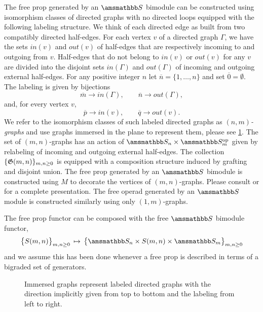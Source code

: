 The free prop generated by an $\S$ bimodule can be constructed using isomorphism classes of directed graphs with no directed loops equipped with the following labeling structure.
We think of each directed edge as built from two compatibly directed half-edges. For each vertex $v$ of a directed graph $\Gamma$, we have the sets $in(v)$ and $out(v)$ of half-edges that are respectively incoming to and outgoing from $v$. Half-edges that do not belong to $in(v)$ or $out(v)$ for any $v$ are divided into the disjoint sets $in(\Gamma)$ and $out(\Gamma)$ of incoming and outgoing external half-edges.
For any positive integer $n$ let $\overline{n} = \{1,\dots,n\}$ and set $\overline{0} = \emptyset$.
The labeling is given by bijections  
\begin{equation*}
\overline{m} \to in(\Gamma), \qquad
\overline{n} \to out(\Gamma),
\end{equation*}
and, for every vertex $v$,
\begin{equation*}
\overline{p} \to in(v), \qquad
\overline{q} \to out(v).
\end{equation*}
We refer to the isomorphism classes of such labeled directed graphs as $(n,m)$\textit{-graphs} and use graphs immersed in the plane to represent them, please see \cref{f:immersion}.
The set of $(m,n)$-graphs has an action of $\S_n \times \S_m^{\op}$ given by relabeling of incoming and outgoing external half-edges.
The collection $\{\mathfrak{G}(m,n)\}_{m,n \geq 0}$ is equipped with a composition structure induced by grafting and disjoint union.
The free prop generated by an $\S$ bimodule is constructed using $M$ to decorate the vertices of $(m,n)$-graphs.
Please consult \cite{Markl08} or \cite{Fresse2010props} for a complete presentation.
The free operad generated by an $\S$ module is constructed similarly using only $(1,m)$-graphs.

The free prop functor can be composed with the free $\S$ bimodule functor, 
\begin{equation*}
\big\{ S(m,n) \big\}_{m,n \geq 0} \, \mapsto \, \big\{ \S_n \times S(m,n) \times \S_m \big\}_{m,n \geq 0}
\end{equation*}
and we assume this has been done whenever a free prop is described in terms of a bigraded set of generators.

\begin{figure}
	
	\caption{Immersed graphs represent labeled directed graphs with the direction implicitly given from top to bottom and the labeling from left to right.}
	\label{f:immersion}
\end{figure}

